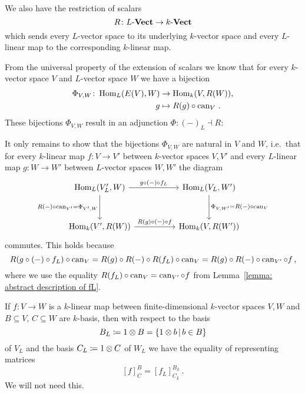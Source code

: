 \begin{remark}
  \label{remark: adjointness of extension and restriction}
  We also have the restriction of scalars
  \[
            R
    \colon  L\text{-}\mathbf{Vect}
    \to     k\text{-}\mathbf{Vect}
  \]
  which sends every $L$-vector space to its underlying $k$-vector space and every $L$-linear map to the corresponding $k$-linear map.
    
  From the universal property of the extension of scalars we know that for every $k$-vector space $V$ and $L$-vector space $W$ we have a bijection
  \begin{align*}
              \Phi_{V,W}
     \colon   \operatorname{Hom}_L(E(V),W)
    &\to      \operatorname{Hom}_k(V,R(W)), \\
              g
    &\mapsto  R(g) \circ \operatorname{can}_V \,.
  \end{align*}
  These bijections $\Phi_{V,W}$ result in an adjunction $\Phi \colon (-)_L \dashv R$:
  
  It only remains to show that the bijections $\Phi_{V,W}$ are natural in $V$ and $W$, i.e.\ that for every $k$-linear map $f \colon V \to V'$ between $k$-vector spaces $V, V'$ and every $L$-linear map $g \colon W \to W'$ between $L$-vector spaces $W, W'$ the diagram
  \[
    \begin{tikzcd}[row sep = 3em, column sep = 5em]
        \Hom_L(V'_L, W)
        \arrow{r}[above]{g \circ (-) \circ f_L}
        \arrow{d}[left]{R(-) \circ \can_{V'} = \Phi_{V',W}}
      & \Hom_L(V_L, W')
        \arrow{d}[right]{\Phi_{V,W'} = R(-) \circ \can_V}
      \\
        \Hom_k(V', R(W))
        \arrow{r}[above]{R(g) \circ (-) \circ f}
      & \Hom_k(V, R(W'))
    \end{tikzcd}
  \]
  commutes.
  This holds because
  \[
      R(g \circ (-) \circ f_L) \circ \operatorname{can}_V
    = R(g) \circ R(-) \circ R(f_L) \circ \operatorname{can}_V
    = R(g) \circ R(-) \circ \operatorname{can}_{V'} \circ f \,,
  \]
  where we use the equality $R(f_L) \circ \operatorname{can}_V = \operatorname{can}_{V'} \circ f$ from Lemma~\ref{lemma: abstract description of fL}.
\end{remark}


\begin{remark}
  If $f \colon V \to W$ is a $k$-linear map between finite-dimensional $k$-vector spaces $V, W$ and $B \subseteq V$, $C \subseteq W$ are $k$-basis, then with respect to the basis
  \[
              B_L
    \defined  1 \otimes B
    =         \{1 \otimes b \suchthat b \in B\}
  \]
  of $V_L$ and the basis $C_L \coloneqq 1 \otimes C$ of $W_L$ we have the equality of representing matrices
  \[
      [f]^B_C
    = [f_L]^{B_L}_{C_L} \,.
  \]
  We will not need this.
\end{remark}




